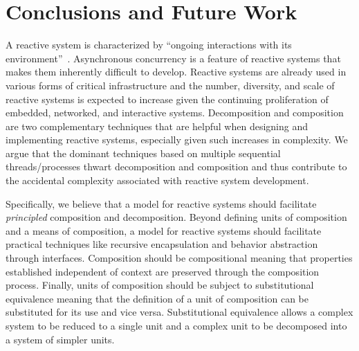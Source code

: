 \chapter{Conclusions and Future Work}
\label{conclusion}

A reactive system is characterized by ``ongoing interactions with its environment''~\cite{manna1992temporal}.
Asynchronous concurrency is a feature of reactive systems that makes them inherently difficult to develop.
Reactive systems are already used in various forms of critical infrastructure and the number, diversity, and scale of reactive systems is expected to increase given the continuing proliferation of embedded, networked, and interactive systems.
Decomposition and composition are two complementary techniques that are helpful when designing and implementing reactive systems, especially given such increases in complexity.
We argue that the dominant techniques based on multiple sequential threads/processes thwart decomposition and composition and thus contribute to the accidental complexity associated with reactive system development.

Specifically, we believe that a model for reactive systems should facilitate \emph{principled} composition and decomposition.
Beyond defining units of composition and a means of composition, a model for reactive systems should facilitate practical techniques like recursive encapsulation and behavior abstraction through interfaces.
Composition should be compositional meaning that properties established independent of context are preserved through the composition process.
Finally, units of composition should be subject to substitutional equivalence meaning that the definition of a unit of composition can be substituted for its use and vice versa.
Substitutional equivalence allows a complex system to be reduced to a single unit and a complex unit to be decomposed into a system of simpler units.

